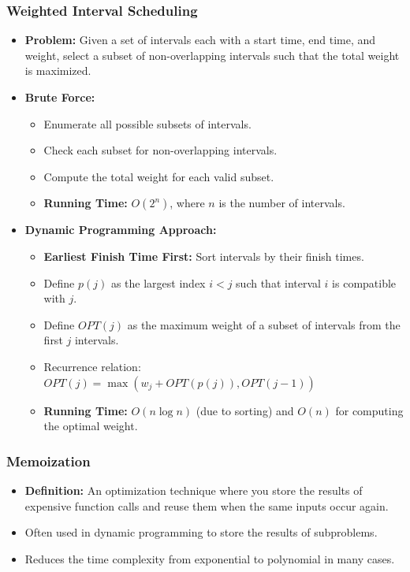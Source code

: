 \documentclass[8pt]{article}
\begin{document}
\subsubsection*{Weighted Interval Scheduling}
\begin{itemize}
    \item \textbf{Problem:} Given a set of intervals each with a start time, end time, and weight, select a subset of non-overlapping intervals such that the total weight is maximized.
    \item \textbf{Brute Force:} 
    \begin{itemize}
        \item Enumerate all possible subsets of intervals.
        \item Check each subset for non-overlapping intervals.
        \item Compute the total weight for each valid subset.
        \item \textbf{Running Time:} \(O(2^n)\), where \(n\) is the number of intervals.
    \end{itemize}
    \item \textbf{Dynamic Programming Approach:}
    \begin{itemize}
        \item \textbf{Earliest Finish Time First:} Sort intervals by their finish times.
        \item Define \(p(j)\) as the largest index \(i < j\) such that interval \(i\) is compatible with \(j\).
        \item Define \(OPT(j)\) as the maximum weight of a subset of intervals from the first \(j\) intervals.
        \item Recurrence relation: \(OPT(j) = \max(w_j + OPT(p(j)), OPT(j-1))\)
        \item \textbf{Running Time:} \(O(n \log n)\) (due to sorting) and \(O(n)\) for computing the optimal weight.
    \end{itemize}
\end{itemize}

\subsubsection*{Memoization}
\begin{itemize}
    \item \textbf{Definition:} An optimization technique where you store the results of expensive function calls and reuse them when the same inputs occur again.
    \item Often used in dynamic programming to store the results of subproblems.
    \item Reduces the time complexity from exponential to polynomial in many cases.
\end{itemize}
\end{document}
